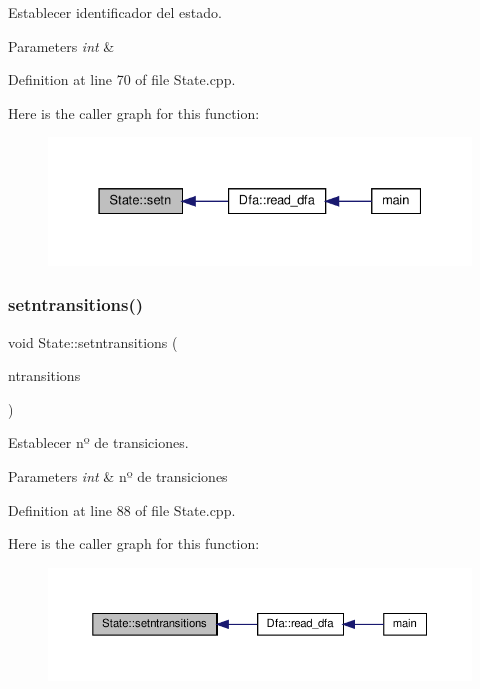 Establecer identificador del estado. 


\begin{DoxyParams}{Parameters}
{\em int} & \\
\hline
\end{DoxyParams}


Definition at line 70 of file State.\+cpp.

Here is the caller graph for this function\+:
\nopagebreak
\begin{figure}[H]
\begin{center}
\leavevmode
\includegraphics[width=331pt]{class_state_af336de67e76fd18020cd363f82a2172e_icgraph}
\end{center}
\end{figure}
\mbox{\label{class_state_aae392034fc0fdf25307007548f5076d6}} 
\subsubsection{\texorpdfstring{setntransitions()}{setntransitions()}}
{\footnotesize\ttfamily void State\+::setntransitions (\begin{DoxyParamCaption}\item[{unsigned int \&}]{ntransitions }\end{DoxyParamCaption})}



Establecer nº de transiciones. 


\begin{DoxyParams}{Parameters}
{\em int} & nº de transiciones \\
\hline
\end{DoxyParams}


Definition at line 88 of file State.\+cpp.

Here is the caller graph for this function\+:
\nopagebreak
\begin{figure}[H]
\begin{center}
\leavevmode
\includegraphics[width=350pt]{class_state_aae392034fc0fdf25307007548f5076d6_icgraph}
\end{center}
\end{figure}
\mbox{\label{class_state_af24ca7913f14e5e73bcead784b4f322d}} 

